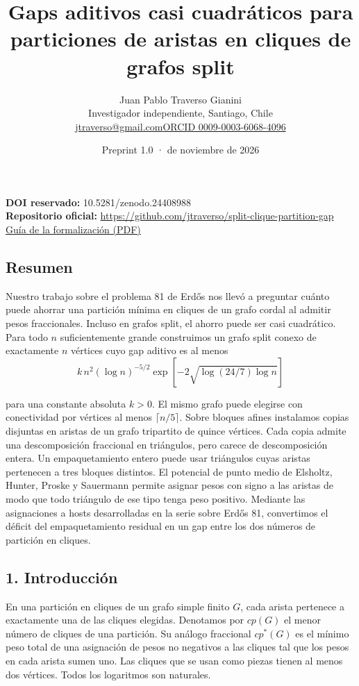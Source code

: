 \documentclass[spanish,11pt,a4paper]{article}
\title{Gaps aditivos casi cuadráticos para particiones de aristas en cliques de grafos split}
\author{Juan Pablo Traverso Gianini\\\small Investigador independiente, Santiago, Chile\\\small\href{mailto:jtraverso@gmail.com}{jtraverso@gmail.com}\quad\href{https://orcid.org/0009-0003-6068-4096}{ORCID 0009-0003-6068-4096}}
\date{Preprint 1.0 \enspace · \enspace 21 de noviembre de 2026}
\begin{document}
\raggedbottom\maketitle
\noindent\textbf{DOI reservado:} 10.5281/zenodo.24408988\\
\textbf{Repositorio oficial:} \url{https://github.com/jtraverso/split-clique-partition-gap}\\
\href{https://github.com/jtraverso/split-clique-partition-gap/blob/main/preprints/SPLITGAP/05_formalization/companion-es.pdf}{Guía de la formalización (PDF)}
\subsection{Resumen}\label{resumen}

Nuestro trabajo sobre el problema 81 de Erdős nos llevó a preguntar cuánto puede ahorrar una partición mínima en cliques de un grafo cordal al admitir pesos fraccionales. Incluso en grafos split, el ahorro puede ser casi cuadrático. Para todo \(n\) suficientemente grande construimos un grafo split conexo de exactamente \(n\) vértices cuyo gap aditivo es al menos
\[k\,n^2(\log n)^{-5/2}\exp\!\left[-2\sqrt{\log(24/7)\log n}\right]\]

para una constante absoluta \(k>0\). El mismo grafo puede elegirse con conectividad por vértices al menos \(\lceil n/5\rceil\). Sobre bloques afines instalamos copias disjuntas en aristas de un grafo tripartito de quince vértices. Cada copia admite una descomposición fraccional en triángulos, pero carece de descomposición entera. Un empaquetamiento entero puede usar triángulos cuyas aristas pertenecen a tres bloques distintos. El potencial de punto medio de Elsholtz, Hunter, Proske y Sauermann permite asignar pesos con signo a las aristas de modo que todo triángulo de ese tipo tenga peso positivo. Mediante las asignaciones a hosts desarrolladas en la serie sobre Erdős 81, convertimos el déficit del empaquetamiento residual en un gap entre los dos números de partición en cliques.

\subsection{1. Introducción}\label{introducciuxf3n}

En una partición en cliques de un grafo simple finito \(G\), cada arista pertenece a exactamente una de las cliques elegidas. Denotamos por \(cp(G)\) el menor número de cliques de una partición. Su análogo fraccional \(cp^*(G)\) es el mínimo peso total de una asignación de pesos no negativos a las cliques tal que los pesos en cada arista sumen uno. Las cliques que se usan como piezas tienen al menos dos vértices. Todos los logaritmos son naturales.
\end{document}
